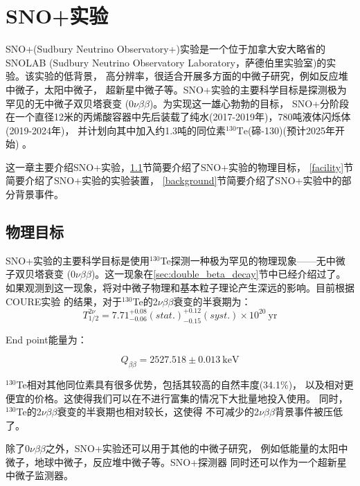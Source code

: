 \chapter{SNO+实验}

SNO+(Sudbury Neutrino Observatory+)实验是一个位于加拿大安大略省的SNOLAB
(Sudbury Neutrino Observatory Laboratory，萨德伯里实验室)的实验。该实验的低背景，
高分辨率，很适合开展多方面的中微子研究，例如反应堆中微子，太阳中微子，
超新星中微子等。SNO+实验的主要科学目标是探测极为罕见的无中微子双贝塔衰变
(0$\nu\beta\beta$)。为实现这一雄心勃勃的目标，
SNO+分阶段在一个直径12米的丙烯酸容器中先后装载了纯水(2017-2019年)，780吨液体闪烁体
(2019-2024年)，
并计划向其中加入约1.3吨的同位素$^{130}\mathrm{Te}$(碲-130)(预计2025年开始)
\cite{andringa2016current}。

这一章主要介绍SNO+实验，\ref{goal}节简要介绍了SNO+实验的物理目标，
\ref{facility}节简要介绍了SNO+实验的实验装置，
\ref{background}节简要介绍了SNO+实验中的部分背景事件。

\section{物理目标}\label{goal}

SNO+实验的主要科学目标是使用${}^{130}$Te探测一种极为罕见的物理现象——无中微子双贝塔衰变
(0$\nu\beta\beta$)。这一现象在\ref{sec:double_beta_decay}节中已经介绍过了。
如果观测到这一现象，将对中微子物理和基本粒子理论产生深远的影响。目前根据COURE实验
的结果，对于${}^{130}$Te的2$\nu\beta\beta$衰变的半衰期为：\cite{PhysRevLett.126.171801}
\begin{equation}
    T_{1/2}^{2\nu} = 7.71^{+0.08}_{-0.06}(stat.)^{+0.12}_{-0.15}(syst.)\times10^{20}~\mathrm{yr}
    \label{eq:2vbb}
\end{equation}

End point能量为：\cite{PhysRevC.80.025501}

\begin{equation}
    Q_{\beta\beta} = 2527.518 \pm 0.013~\mathrm{keV}
    \label{eq:Qbb}
\end{equation}

${}^{130}$Te相对其他同位素具有很多优势，包括其较高的自然丰度(34.1\%)，
以及相对更便宜的价格。这使得我们可以在不进行富集的情况下大批量地投入使用。
同时，${}^{130}$Te的2$\nu\beta\beta$衰变的半衰期也相对较长，这使得
不可减少的2$\nu\beta\beta$背景事件被压低了。

除了0$\nu\beta\beta$之外，SNO+实验还可以用于其他的中微子研究，
例如低能量的太阳中微子，地球中微子，反应堆中微子等。SNO+探测器
同时还可以作为一个超新星中微子监测器。


